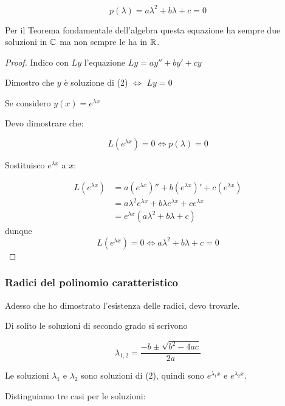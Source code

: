 \[
    p(\lambda) = a \lambda^{2}+b \lambda + c =0
\]

Per il Teorema fondamentale dell'algebra questa equazione ha sempre due soluzioni in \(\mathbb{C} \) ma non sempre le ha in \(\mathbb{R} \).

\begin{proof}
    Indico con \(Ly\) l'equazione \(Ly= ay''+by'+cy\)

    Dimostro che \(y\) è soluzione di (2) \(\iff \) \(Ly=0\)

    Se considero \(y(x) = e ^{\lambda x}\)

    Devo dimostrare che:

    \[
        L(e ^{\lambda x}) = 0 \iff  p(\lambda) = 0
    \]

    Sostituisco \(e ^{\lambda x}\) a \(x\):

    \begin{align*}
        L(e ^{\lambda x}) & = a( e^{\lambda x})'' + b( e ^{\lambda x})' + c(e ^{\lambda x})              \\
                          & = a \lambda ^{2} e ^{\lambda x} + b \lambda e ^{\lambda x} + c e^{\lambda x} \\
                          & = e ^{\lambda x}(a \lambda ^{2}+ b \lambda+ c)
    \end{align*}
    dunque
    \[
        L( e ^{\lambda x}) = 0 \iff a \lambda ^{2}+ b \lambda +c = 0
    \]

\end{proof}

\subsubsection*{Radici del polinomio caratteristico}

Adesso che ho dimostrato l'esistenza delle radici, devo trovarle.

Di solito le soluzioni di secondo grado si scrivono

\[
    \lambda_{1,2} = \frac{-b \pm \sqrt{b ^{2}-4 ac}}{2a}
\]

Le soluzioni \(\lambda_1\) e \(\lambda_2\) sono soluzioni di (2), quindi sono \(e ^{\lambda_1x}\) e \(e ^{\lambda_2x}\).

Distinguiamo tre casi per le soluzioni:

